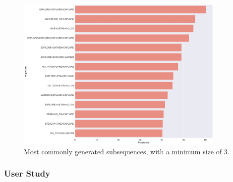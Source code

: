 \begin{figure}[]
    \centering
    \includegraphics[width=0.9\textwidth]{included-papers-tex/paper-8/figures/CommonSubsequence-GSP.png}
    \caption{Most commonly generated subsequences, with a minimum size of 3.}
    \label{figs:evaluation:CommonSequence}
\end{figure}



\subsubsection{User Study}




